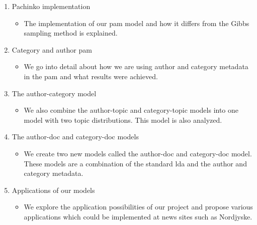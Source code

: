\begin{enumerate}
\begin{itemize}
	\end{itemize}
	\item Pachinko implementation
	\begin{itemize}
		\item The implementation of our \gls{pam} model and how it differs from the Gibbs sampling method is explained.
	\end{itemize}
	\item Category and author \gls{pam}
	\begin{itemize}
		\item We go into detail about how we are using author and category metadata in the \gls{pam} and what results were achieved.
	\end{itemize}
	\item The author-category model
	\begin{itemize}
		\item We also combine the author-topic and category-topic models into one model with two topic distributions. This model is also analyzed.
	\end{itemize}
	\item The author-doc and category-doc models
	\begin{itemize}
		\item We create two new models called the author-doc and category-doc model. These models are a combination of the standard \gls{lda} and the author and category metadata.
	\end{itemize}
	\item Applications of our models
	\begin{itemize}
		\item We explore the application possibilities of our project and propose various applications which could be implemented at news sites such as Nordjyske.
	\end{itemize}
\end{enumerate}
